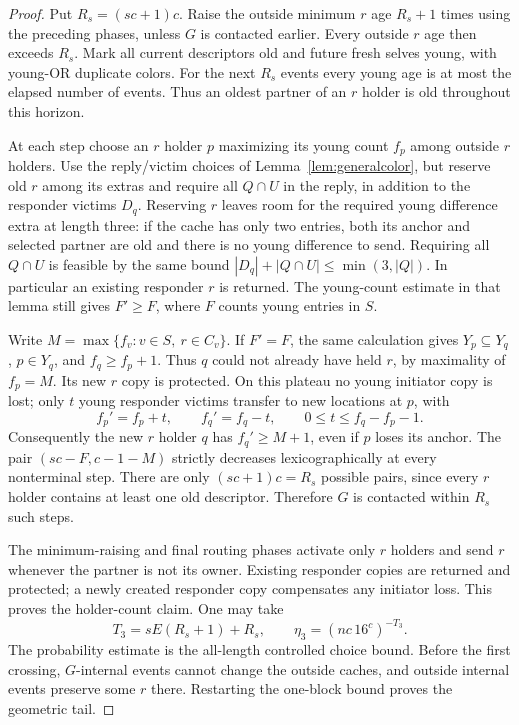 \documentclass[11pt]{article}
\begin{document}
\begin{proof}
Put $R_s=(sc+1)c$. Raise the outside minimum $r$ age
$R_s+1$ times using the preceding phases, unless $G$
is contacted earlier. Every outside $r$ age then
exceeds $R_s$. Mark all current descriptors old and
future fresh selves young, with young-OR duplicate
colors. For the next $R_s$ events every young age is
at most the elapsed number of events. Thus an oldest
partner of an $r$ holder is old throughout this horizon.

At each step choose an $r$ holder $p$ maximizing its
young count $f_p$ among outside $r$ holders. Use the
reply/victim choices of Lemma~\ref{lem:generalcolor},
but reserve old $r$ among its extras and require all
$Q\cap U$ in the reply, in addition to the responder
victims $D_q$. Reserving $r$ leaves room for the
required young difference extra at length three:
if the cache has only two entries, both its anchor
and selected partner are old and there is no young
difference to send. Requiring all $Q\cap U$ is feasible
by the same bound $|D_q|+|Q\cap U|\le\min(3,|Q|)$.
In particular an existing responder $r$ is returned.
The young-count estimate in that lemma still gives
$F'\ge F$, where $F$ counts young entries in $S$.

Write $M=\max\{f_v:v\in S,\ r\in C_v\}$.
If $F'=F$, the same calculation gives
$Y_p\subseteq Y_q$, $p\in Y_q$, and $f_q\ge f_p+1$.
Thus $q$ could not already have held $r$, by maximality
of $f_p=M$. Its new $r$ copy is protected. On this
plateau no young initiator copy is lost; only $t$
young responder victims transfer to new locations
at $p$, with
\[
 f_p'=f_p+t,\qquad f_q'=f_q-t,\qquad
 0\le t\le f_q-f_p-1.
\]
Consequently the new $r$ holder $q$ has
$f_q'\ge M+1$, even if $p$ loses its anchor.
The pair $(sc-F,c-1-M)$ strictly decreases
lexicographically at every nonterminal step.
There are only $(sc+1)c=R_s$ possible pairs,
since every $r$ holder contains at least one old
descriptor. Therefore $G$ is contacted within $R_s$
such steps.

The minimum-raising and final routing phases activate
only $r$ holders and send $r$ whenever the partner is
not its owner. Existing responder copies are returned
and protected; a newly created responder copy compensates
any initiator loss. This proves the holder-count claim.
One may take
\[
 T_3=sE(R_s+1)+R_s,\qquad
 \eta_3=(nc\,16^c)^{-T_3}.
\]
The probability estimate is the all-length controlled
choice bound. Before the first crossing, $G$-internal
events cannot change the outside caches, and outside
internal events preserve some $r$ there. Restarting
the one-block bound proves the geometric tail.
\end{proof}
\end{document}
